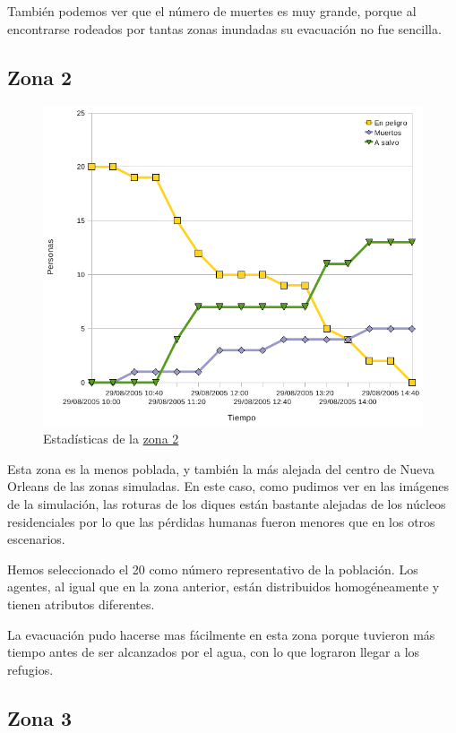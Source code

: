 También podemos ver que el número de muertes es muy grande, porque al
encontrarse rodeados por tantas zonas inundadas su evacuación no fue sencilla.

\subsection{Zona 2}

\begin{figure}[H]
 \centering
 \includegraphics[width=135mm]{figuras/cap6/stats/Zona2.png}
 \caption{Estadísticas de la \hyperref[zona2]{zona 2}}
\end{figure}

Esta zona es la menos poblada, y también la más alejada del centro de Nueva
Orleans de las zonas simuladas. En este caso, como pudimos ver en las imágenes
de la simulación, las roturas de los  diques están bastante alejadas de los
núcleos residenciales por lo que las pérdidas humanas fueron menores que en los
otros escenarios.

Hemos seleccionado el 20 como número representativo de la población. Los
agentes, al igual que en la zona anterior, están distribuidos homogéneamente y
tienen atributos diferentes.

La evacuación pudo hacerse mas fácilmente en esta zona porque tuvieron más
tiempo antes de ser alcanzados por el agua, con lo que lograron llegar a los
refugios.

\subsection{Zona 3}

